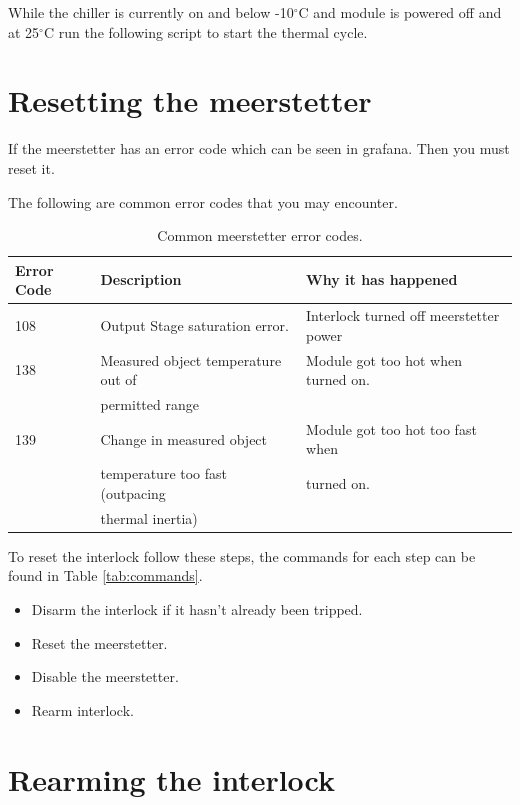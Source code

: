 \documentclass[12pt]{article}
\begin{document}
While the chiller is currently on and below -10$^\circ$C and module is powered off and at 25$^\circ$C run the following script to start the thermal cycle. 


\section{Resetting the meerstetter}
\label{sec:meerstetter}

If the meerstetter has an error code which can be seen in grafana. Then you must reset it. 

The following are common error codes that you may encounter. 
\begin{table}[H]
    \centering
    \begin{tabular}{l|l|l}
        \hline 
        Error Code & Description & Why it has happened\\
        \hline
        \hline
        108 & Output Stage saturation error.  & Interlock turned off meerstetter power\\
        138 & Measured object temperature out of& Module got too hot when turned on.\\
        &permitted range&\\
        139 & Change in measured object & Module got too hot too fast when\\
        &temperature too fast (outpacing& turned on.\\
        &thermal inertia)&\\
        \hline
    \end{tabular}
    \caption{Common meerstetter error codes.}
    \label{tab:meer}
\end{table}

To reset the interlock follow these steps, the commands for each step can be found in Table \ref{tab:commands}. 
\begin{itemize}
    \item Disarm the interlock if it hasn't already been tripped.
    \item Reset the meerstetter.
    \item Disable the meerstetter.
    \item Rearm interlock.
\end{itemize}

\section{Rearming the interlock}
\label{sec:interlock}
\end{document}
